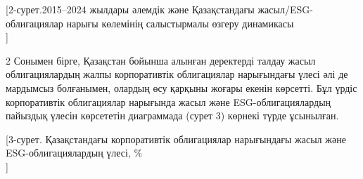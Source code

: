 [2-сурет.2015--2024 жылдары әлемдік және Қазақстандағы
жасыл/ESG-облигациялар нарығы көлемінің салыстырмалы өзгеру
динамикасы\\]

\begin{multicols}{2}
Сонымен бірге, Қазақстан бойынша алынған деректерді талдау жасыл
облигациялардың жалпы корпоративтік облигациялар нарығындағы үлесі әлі
де мардымсыз болғанымен, олардың өсу қарқыны жоғары екенін көрсетті. Бұл
үрдіс корпоративтік облигациялар нарығында жасыл және
ESG-облигациялардың пайыздық үлесін көрсететін диаграммада (сурет 3)
көрнекі түрде ұсынылған.
\end{multicols}

[3-сурет. Қазақстандағы корпоративтік облигациялар
нарығындағы жасыл және ESG-облигациялардың үлесі,
\%\\]

